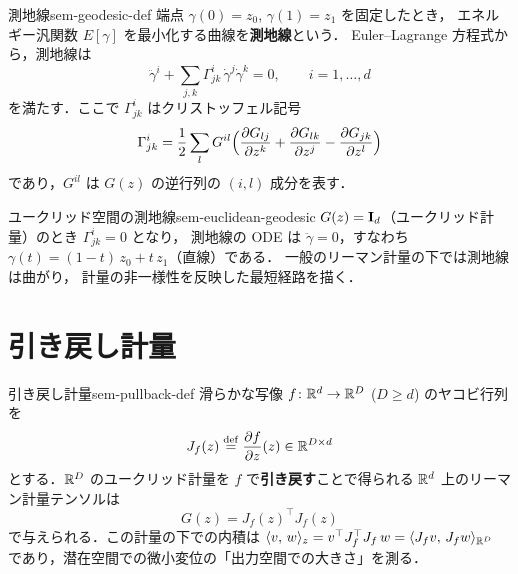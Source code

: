 \begin{definition}{測地線}{sem-geodesic-def}
  端点 $\gamma(0) = z_0$, $\gamma(1) = z_1$ を固定したとき，
  エネルギー汎関数 $E[\gamma]$ を最小化する曲線を\textbf{測地線}という．
  Euler--Lagrange 方程式から，測地線は
  \begin{equation}
    \ddot{\gamma}^i + \sum_{j,k} \Gamma^i_{jk}\, \dot{\gamma}^j \dot{\gamma}^k = 0,
    \qquad i = 1, \ldots, d
    \label{eq:geodesic-ode}
  \end{equation}
  を満たす．ここで $\Gamma^i_{jk}$ はクリストッフェル記号
  \[
    \Gamma^i_{jk}
    = \frac{1}{2} \sum_l G^{il}
      \Bigl(\frac{\partial G_{lj}}{\partial z^k}
           + \frac{\partial G_{lk}}{\partial z^j}
           - \frac{\partial G_{jk}}{\partial z^l}\Bigr)
  \]
  であり，$G^{il}$ は $G(z)$ の逆行列の $(i,l)$ 成分を表す．
\end{definition}

\begin{remark}{ユークリッド空間の測地線}{sem-euclidean-geodesic}
  $G(z) = \mathbf{I}_d$（ユークリッド計量）のとき
  $\Gamma^i_{jk} = 0$ となり，
  測地線の ODE は $\ddot{\gamma} = 0$，すなわち
  $\gamma(t) = (1-t)\, z_0 + t\, z_1$（直線）である．
  一般のリーマン計量の下では測地線は曲がり，
  計量の非一様性を反映した最短経路を描く．
\end{remark}

\section{引き戻し計量}
\label{sec:sem-pullback-metric}

\begin{definition}{引き戻し計量}{sem-pullback-def}
  滑らかな写像 $f \colon \mathbb{R}^d \to \mathbb{R}^D$ ($D \ge d$) のヤコビ行列を
  \[
    J_f(z) \overset{\mathrm{def}}{=} \frac{\partial f}{\partial z}(z) \in \mathbb{R}^{D \times d}
  \]
  とする．$\mathbb{R}^D$ のユークリッド計量を $f$ で\textbf{引き戻す}ことで得られる
  $\mathbb{R}^d$ 上のリーマン計量テンソルは
  \begin{equation}
    G(z) = J_f(z)^\top J_f(z)
    \label{eq:pullback-metric}
  \end{equation}
  で与えられる．この計量の下での内積は
  $\langle v,\, w \rangle_z = v^\top J_f^\top J_f\, w = \langle J_f v,\, J_f w \rangle_{\mathbb{R}^D}$
  であり，潜在空間での微小変位の「出力空間での大きさ」を測る．
\end{definition}

